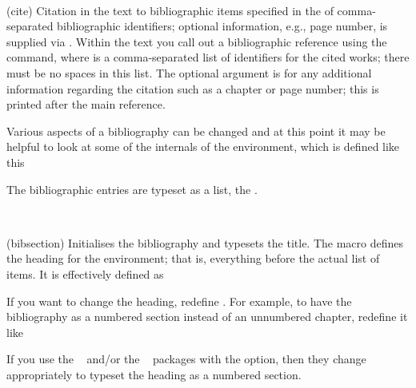 \begin{syntax}
\cmd{\cite} \\
\end{syntax}
\glossary(cite)%
  {}%
  {Citation in the text to bibliographic items specified in the 
    of comma-separated bibliographic identifiers;
  optional information, e.g., page number, is supplied via .}
Within the text you call out a bibliographic 
reference using the
\cmd{\cite} command, where  is a comma-separated
list of identifiers for the cited works; there must be no spaces in this 
list. The optional  argument is for any additional
information regarding the citation such as a chapter or page number;
this is printed after the main reference. 

    Various aspects of a bibliography can be changed and at this point
it may be helpful to look at some of the internals of the 
environment, which is defined like this
\begin{lcode}
\newenvironment{thebibliography}[1]{%
  \bibsection
  \begin{bibitemlist}{#1}}%
  {\end{bibitemlist}\postbibhook}
\end{lcode}
The bibliographic entries are typeset as a list, the .

\begin{syntax}
\cmd{\bibsection} \\
\end{syntax}
\glossary(bibsection)%
  {}%
  {Initialises the bibliography and typesets the title.}
The macro \cmd{\bibsection} defines the heading 
for the 
environment; that is, everything before the actual list of items.
It is effectively defined as
\begin{lcode}
\newcommand{\bibsection}{%
  \chapter*{\bibname}
  \bibmark
  \ifnobibintoc\else
    \phantomsection
    \addcontentsline{toc}{chapter}{\bibname}
  \fi
  \prebibhook}
\end{lcode}
If you want to change the heading, redefine \cmd{\bibsection}. For example,
to have the bibliography as a numbered section instead of an unnumbered
chapter, redefine it like
\begin{lcode}
\renewcommand{\bibsection}{%
  \section{\bibname}
  \prebibhook}
\end{lcode}
If you use the ~\cite{NATBIB} and/or the 
~\cite{CHAPTERBIB} packages with the 
option, then they change \cmd{\bibsection} appropriately to typeset the
heading as a numbered section.


